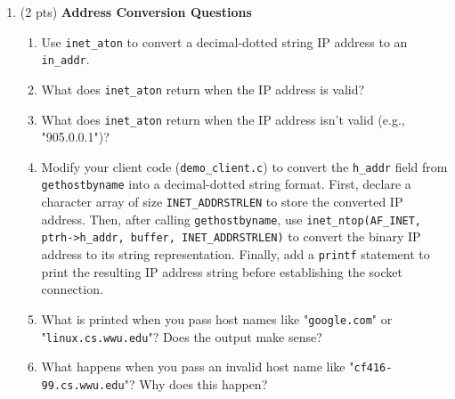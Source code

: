 \documentclass[12pt]{article}
\begin{document}
\begin{enumerate}[label=Q\arabic*:]
    \item (2 pts) \textbf{Address Conversion Questions}
    \begin{enumerate}[label=(\alph*)]
        \item Use \texttt{inet\_aton} to convert a decimal-dotted string IP address to an \texttt{in\_addr}.
        \item What does \texttt{inet\_aton} return when the IP address is valid?
        \item What does \texttt{inet\_aton} return when the IP address isn't valid (e.g., "905.0.0.1")?
        \item Modify your client code (\texttt{demo\_client.c}) to convert the \texttt{h\_addr} field from \texttt{gethostbyname} into a decimal-dotted string format. First, declare a character array of size \texttt{INET\_ADDRSTRLEN} to store the converted IP address. Then, after calling \texttt{gethostbyname}, use \texttt{inet\_ntop(AF\_INET, ptrh->h\_addr, buffer, INET\_ADDRSTRLEN)} to convert the binary IP address to its string representation. Finally, add a \texttt{printf} statement to print the resulting IP address string before establishing the socket connection.
        \item What is printed when you pass host names like "\texttt{google.com}" or "\texttt{linux.cs.wwu.edu}"? Does the output make sense?
        \item What happens when you pass an invalid host name like "\texttt{cf416-99.cs.wwu.edu}"? Why does this happen?
    \end{enumerate}
    
\end{enumerate}
\end{document}
